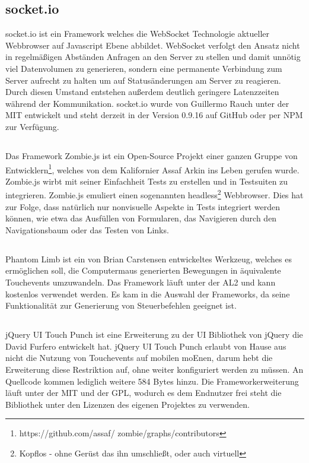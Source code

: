	\subsection{socket.io}
	socket.io ist ein \Gls{Framework} welches die WebSocket Technologie aktueller \Gls{Webbrowser} auf \Gls{Javascript} Ebene abbildet. WebSocket verfolgt den Ansatz nicht in regelmäßigen Abständen Anfragen an den Server zu stellen und damit unnötig viel Datenvolumen zu generieren, sondern eine permanente Verbindung zum Server aufrecht zu halten um auf Statusänderungen am Server zu reagieren. Durch diesen Umstand entstehen außerdem deutlich geringere Latenzzeiten während der Kommunikation. socket.io wurde von Guillermo Rauch unter der \Gls{MIT} entwickelt und steht derzeit in der Version 0.9.16 auf GitHub oder per \Gls{NPM} zur Verfügung.
	
	\subsection{}
	Das \Gls{Framework} Zombie.js ist ein Open-Source Projekt einer ganzen Gruppe von Entwicklern\footnote{https://github.com/assaf/	zombie/graphs/contributors}, welches von dem Kalifornier Assaf Arkin ins Leben gerufen wurde. Zombie.js wirbt mit 	seiner Einfachheit \Gls{Test}s zu erstellen und in \Gls{Test}suiten zu integrieren. Zombie.js emuliert einen sogenannten headless\footnote{Kopflos - ohne Gerüst das ihn umschließt, oder auch virtuell} \Gls{Webbrowser}. Dies hat zur Folge, dass natürlich nur nonvisuelle Aspekte in \Gls{Test}s integriert werden können, wie etwa das Ausfüllen von Formularen, das Navigieren durch den Navigationsbaum oder das Testen von Links.

	\subsection{}
	Phantom Limb ist ein von Brian Carstensen entwickeltes Werkzeug, welches es ermöglichen soll, die \Gls{Computer}maus generierten Bewegungen in äquivalente \mbox{Touchevents} umzuwandeln. Das \Gls{Framework} läuft unter der \Gls{AL2} und kann kostenlos 	verwendet werden. Es kam in die Auswahl der \Gls{Framework}s, da seine Funktionalität zur Generierung von Steuerbefehlen geeignet ist.
	
	\subsection{}
	jQuery UI Touch Punch ist eine Erweiterung zu der UI Bibliothek von jQuery die David Furfero entwickelt hat. jQuery UI Touch Punch erlaubt von Hause aus nicht die Nutzung von Touchevents auf mobilen \Gls{moEn}en, darum hebt die Erweiterung diese Restriktion auf, ohne weiter konfiguriert werden zu müssen. An Quellcode kommen lediglich weitere 584 Bytes hinzu. Die \Gls{Framework}erweiterung läuft unter der MIT und der \Gls{GPL}, wodurch es dem Endnutzer frei steht die Bibliothek unter den Lizenzen des eigenen Projektes zu verwenden.
	
